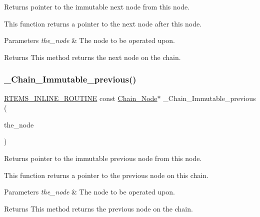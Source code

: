 Returns pointer to the immutable next node from this node. 

This function returns a pointer to the next node after this node.


\begin{DoxyParams}{Parameters}
{\em the\+\_\+node} & The node to be operated upon.\\
\hline
\end{DoxyParams}
\begin{DoxyReturn}{Returns}
This method returns the next node on the chain. 
\end{DoxyReturn}
\mbox{\label{group__RTEMSScoreChain_gaa81e1b020b85914e70cae9736bf5b3e3}} 
\subsubsection{\texorpdfstring{\_Chain\_Immutable\_previous()}{\_Chain\_Immutable\_previous()}}
{\footnotesize\ttfamily \mbox{\hyperlink{group__RTEMSScoreBaseDefs_gac216239df231d5dbd15e3520b0b9313f}{R\+T\+E\+M\+S\+\_\+\+I\+N\+L\+I\+N\+E\+\_\+\+R\+O\+U\+T\+I\+NE}} const \mbox{\hyperlink{group__RTEMSScoreChain_ga0dd4bfcca1ac7f90de2842e447846d3d}{Chain\+\_\+\+Node}}$\ast$ \+\_\+\+Chain\+\_\+\+Immutable\+\_\+previous (\begin{DoxyParamCaption}\item[{const \mbox{\hyperlink{group__RTEMSScoreChain_ga0dd4bfcca1ac7f90de2842e447846d3d}{Chain\+\_\+\+Node}} $\ast$}]{the\+\_\+node }\end{DoxyParamCaption})}



Returns pointer to the immutable previous node from this node. 

This function returns a pointer to the previous node on this chain.


\begin{DoxyParams}{Parameters}
{\em the\+\_\+node} & The node to be operated upon.\\
\hline
\end{DoxyParams}
\begin{DoxyReturn}{Returns}
This method returns the previous node on the chain. 
\end{DoxyReturn}
\mbox{\label{group__RTEMSScoreChain_ga2dad341ef33d4fdcd23ce2b30d8c1c9c}} 
